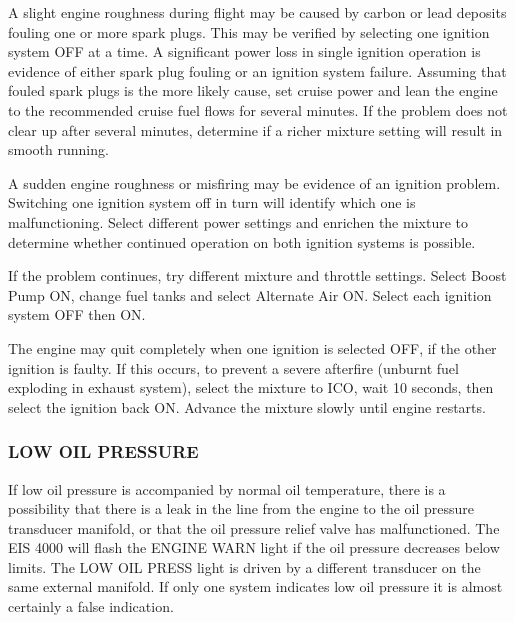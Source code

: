 A slight engine roughness during flight may be caused by carbon or lead deposits fouling one or more spark plugs. 
This may be verified by selecting one ignition system OFF at a time.  A significant power loss in single ignition
operation is evidence of either spark plug fouling or an ignition system failure.  Assuming that fouled spark plugs is
the more likely cause, set cruise power and lean the engine to the recommended cruise fuel flows for several minutes. 
If the problem does not clear up after several minutes, determine if a richer mixture setting will result in smooth
running.

A sudden engine roughness or misfiring may be evidence of an ignition problem. Switching one ignition system off in turn will identify which one is malfunctioning.  Select different power settings
and enrichen the mixture to determine whether continued operation on both ignition systems is possible.

If the problem continues, try different mixture and throttle settings. Select Boost Pump ON,
change fuel tanks and select Alternate Air ON. Select each ignition system
OFF then ON.

\begin{Note}[CAUTION]
The engine may quit completely when one ignition is selected OFF, if the other ignition is faulty.  
If this occurs, to prevent a severe afterfire (unburnt fuel exploding in exhaust system), select the mixture to ICO, wait 10 seconds, then select the ignition back ON.
Advance the mixture slowly until engine restarts.
\end{Note}

%

\subsubsection{LOW OIL PRESSURE}

If low oil pressure is accompanied by normal oil temperature, there is a possibility that there is a leak in the line
from the engine to the oil pressure transducer manifold, or that the oil pressure relief valve has malfunctioned.  The
EIS 4000
will flash the ENGINE WARN light if the oil pressure decreases below limits. The LOW OIL PRESS light is driven by a
different transducer on the same external manifold. If only one system indicates low oil pressure it is almost certainly
a false indication.

